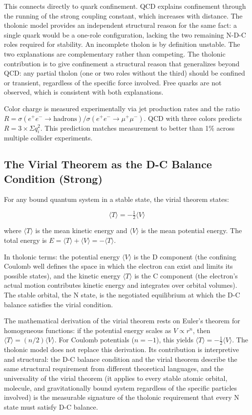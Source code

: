 \documentclass[12pt]{article}
\begin{document}
This connects directly to quark confinement. QCD explains confinement
through the running of the strong coupling constant, which increases
with distance. The tholonic model provides an independent structural
reason for the same fact: a single quark would be a one-role
configuration, lacking the two remaining N-D-C roles required for
stability. An incomplete tholon is by definition unstable. The two
explanations are complementary rather than competing. The tholonic
contribution is to give confinement a structural reason that generalizes
beyond QCD: any partial tholon (one or two roles without the third)
should be confined or transient, regardless of the specific force
involved. Free quarks are not observed, which is consistent with both
explanations.

Color charge is measured experimentally via jet production rates and the
ratio
\(R = \sigma(e^+e^- \to \text{hadrons}) / \sigma(e^+e^- \to \mu^+\mu^-)\).
QCD with three colors predicts \(R = 3 \times \Sigma q_i^2\). This
prediction matches measurement to better than 1\% across multiple
collider experiments.

\subsection{The Virial Theorem as the D-C Balance Condition (Strong)}\label{the-virial-theorem-as-the-d-c-balance-condition-strong}

For any bound quantum system in a stable state, the virial theorem
states:

\[\langle T \rangle = -\tfrac{1}{2}\langle V \rangle\]

where \(\langle T \rangle\) is the mean kinetic energy and
\(\langle V \rangle\) is the mean potential energy. The total energy is
\(E = \langle T \rangle + \langle V \rangle = -\langle T \rangle\).

In tholonic terms: the potential energy \(\langle V \rangle\) is the D
component (the confining Coulomb well defines the space in which the
electron can exist and limits its possible states), and the kinetic
energy \(\langle T \rangle\) is the C component (the electron's actual
motion contributes kinetic energy and integrates over orbital volumes).
The stable orbital, the N state, is the negotiated equilibrium at which
the D-C balance satisfies the virial condition.

The mathematical derivation of the virial theorem rests on Euler's
theorem for homogeneous functions: if the potential energy scales as
\(V \propto r^n\), then \(\langle T \rangle = (n/2)\langle V \rangle\).
For Coulomb potentials (\(n = -1\)), this yields
\(\langle T \rangle = -\tfrac{1}{2}\langle V \rangle\). The tholonic
model does not replace this derivation. Its contribution is interpretive
and structural: the D-C balance condition and the virial theorem
describe the same structural requirement from different theoretical
languages, and the universality of the virial theorem (it applies to
every stable atomic orbital, molecule, and gravitationally bound system
regardless of the specific particles involved) is the measurable
signature of the tholonic requirement that every N state must satisfy
D-C balance.
\end{document}
